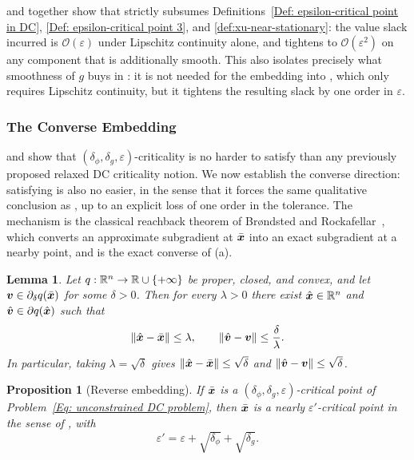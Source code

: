 \documentclass[english]{article}
\newtheorem{lemma}{Lemma}[section]
\newtheorem{proposition}{Proposition}[section]
\begin{document}
 and
 together show that
 strictly subsumes
Definitions~\ref{Def: epsilon-critical point in DC},
\ref{Def: epsilon-critical point 3}, and \ref{def:xu-near-stationary}: the
value slack incurred is $\mathcal O(\varepsilon)$ under Lipschitz
continuity alone, and tightens to $\mathcal O(\varepsilon^2)$ on any
component that is additionally smooth. This also isolates precisely what
smoothness of $g$ buys in \citet{xu2019stochastic}: it is not needed for
the embedding into , which only requires
Lipschitz continuity, but it tightens the resulting slack by one order in
$\varepsilon$.

\subsubsection{The Converse Embedding}

 and 
show that $(\delta_\phi,\delta_g,\varepsilon)$-criticality is no harder to
satisfy than any previously proposed relaxed DC criticality notion. We now
establish the converse direction: satisfying 
is also no easier, in the sense that it forces the same qualitative
conclusion as , up to an explicit loss
of one order in the tolerance. The mechanism is the classical reachback
theorem of Brøndsted and Rockafellar~\citep{brondsted1965subdifferentiability},
which converts an approximate subgradient at $\bar{\bm{x}}$ into an exact
subgradient at a nearby point, and is the exact converse of
(a).

\begin{lemma}
\label{lem:value-to-spatial}
Let $q:\mathbb{R}^n\to\mathbb{R}\cup\{+\infty\}$ be proper, closed, and convex, and let
$\bm{v}\in\partial_\delta q(\bar{\bm{x}})$ for some $\delta>0$. Then for every
$\lambda>0$ there exist $\hat{\bm{x}}\in\mathbb{R}^n$ and $\hat{\bm{v}}\in\partial
q(\hat{\bm{x}})$ such that
\[
    \|\hat{\bm{x}}-\bar{\bm{x}}\|\le\lambda,
    \qquad
    \|\hat{\bm{v}}-\bm{v}\|\le\frac{\delta}{\lambda}.
\]
In particular, taking $\lambda=\sqrt\delta$ gives
$\|\hat{\bm{x}}-\bar{\bm{x}}\|\le\sqrt\delta$ and $\|\hat{\bm{v}}-\bm{v}\|\le\sqrt\delta$.
\end{lemma}

\begin{proposition}[Reverse embedding]
\label{prop:reverse-embedding}
If $\bar{\bm{x}}$ is a $(\delta_\phi,\delta_g,\varepsilon)$-critical point of
Problem~\eqref{Eq: unconstrained DC problem}, then $\bar{\bm{x}}$ is a nearly
$\varepsilon'$-critical point in the sense of
, with
\[
    \varepsilon'=\varepsilon+\sqrt{\delta_\phi}+\sqrt{\delta_g}.
\]
\end{proposition}
\end{document}
